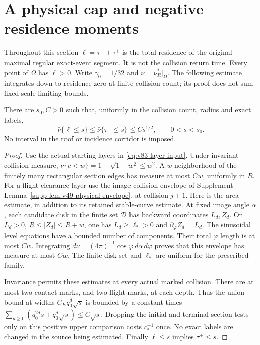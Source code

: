 \section{A physical cap and negative residence moments}
\label{sec:v88-residence}
Throughout this section $\ell=\tau^-+\tau^+$ is the total residence
of the original maximal regular exact-event segment. It is not the
collision return time. Every point of $\Omega$ has $\ell>0$.
Write $\gamma_0=1/32$ and $\bar\nu=\nu_R^*|_\Omega$.
The following estimate integrates down to residence zero at finite
collision count; its proof does not sum fixed-scale limiting bounds.

\begin{lemma}
\label{lem:v88-physical-cap}
There are $s_0,C>0$ such that, uniformly in the collision count,
radius and exact labels,
\begin{equation}\label{eq:v88-physical-cap}
 \bar\nu\{\ell\le s\}\le \bar\nu\{\tau^+\le s\}
                                      \le C s^{1/2},\qquad 0<s<s_0.
\end{equation}
No interval in the roof or incidence corridor is imposed.
\end{lemma}
\begin{proof}
Use the actual starting layers in \eqref{eq:v83-layer-input}.
Under invariant collision measure, $\nu\{c<w\}=1-\sqrt{1-w^2}
\le w^2$. A $w$-neighborhood of the finitely many rectangular
section edges has measure at most $Cw$, uniformly in $R$.
For a flight-clearance layer use the image-collision envelope of
Supplement Lemma~\ref{supp-lem:v49-physical-envelope}, at collision
$j+1$. Here is the area estimate, in addition to its retained
stable-curve estimate. At fixed image angle $\alpha$, each candidate
disk in the finite set $\mathcal D$ has backward coordinates
$L_d,Z_d$. On $L_d>0$, $R\le |Z_d|\le R+w$, one has
$L_d\ge\ell_*>0$ and $\partial_\varphi Z_d=L_d$. The sinusoidal
level equations have a bounded number of components. Their total
$\varphi$ length is at most $Cw$. Integrating
$d\nu=(4\pi)^{-1}\cos\varphi\,d\alpha\,d\varphi$ proves that
this envelope has measure at most $Cw$. The finite disk set and
$\ell_*$ are uniform for the prescribed family.

Invariance permits these estimates at every actual marked collision.
There are at most two contact marks, and two flight marks, at each
depth. Thus the union bound at widths $C_Eq_0^d\sqrt s$ is bounded
by a constant times
$\sum_{d\ge0}(q_0^{2d}s+q_0^d\sqrt s)\le C\sqrt s$.
Dropping the initial and terminal section tests only on this positive
upper comparison costs $c_*^{-1}$ once. No exact labels are changed
in the source being estimated. Finally $\ell\le s$ implies
$\tau^+\le s$.
\end{proof}

